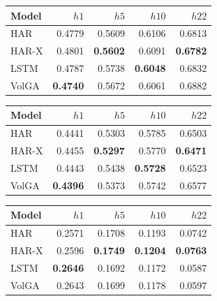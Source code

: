 \begin{tabular}{lrrrr}
\toprule
Model & $h1$ & $h5$ & $h10$ & $h22$ \\
\midrule
HAR & 0.4779 & 0.5609 & 0.6106 & 0.6813 \\
HAR-X & 0.4801 & \textbf{0.5602} & 0.6091 & \textbf{0.6782} \\
LSTM & 0.4787 & 0.5738 & \textbf{0.6048} & 0.6832 \\
VolGA & \textbf{0.4740} & 0.5672 & 0.6061 & 0.6882 \\
\bottomrule
\end{tabular}

\begin{tabular}{lrrrr}
\toprule
Model & $h1$ & $h5$ & $h10$ & $h22$ \\
\midrule
HAR & 0.4441 & 0.5303 & 0.5785 & 0.6503 \\
HAR-X & 0.4455 & \textbf{0.5297} & 0.5770 & \textbf{0.6471} \\
LSTM & 0.4443 & 0.5438 & \textbf{0.5728} & 0.6523 \\
VolGA & \textbf{0.4396} & 0.5373 & 0.5742 & 0.6577 \\
\bottomrule
\end{tabular}

\begin{tabular}{lrrrr}
\toprule
Model & $h1$ & $h5$ & $h10$ & $h22$ \\
\midrule
HAR & 0.2571 & 0.1708 & 0.1193 & 0.0742 \\
HAR-X & 0.2596 & \textbf{0.1749} & \textbf{0.1204} & \textbf{0.0763} \\
LSTM & \textbf{0.2646} & 0.1692 & 0.1172 & 0.0587 \\
VolGA & 0.2643 & 0.1699 & 0.1178 & 0.0597 \\
\bottomrule
\end{tabular}
